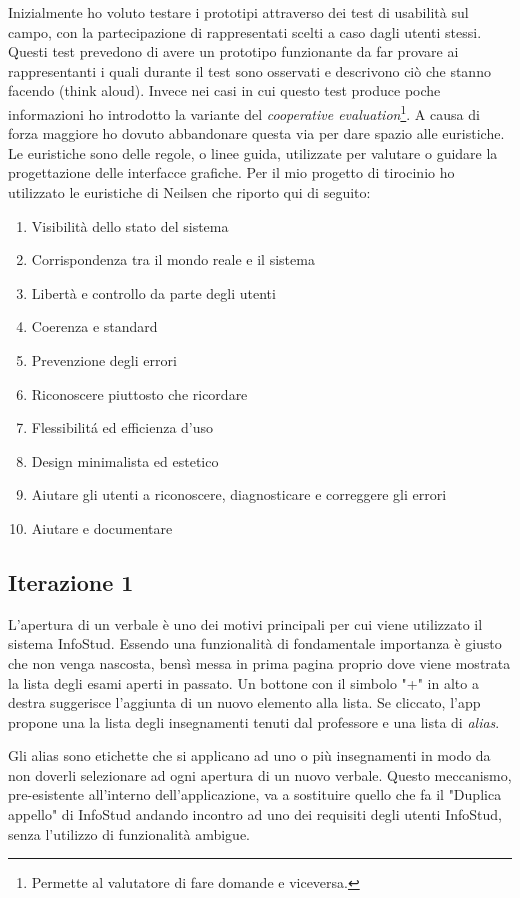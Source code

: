\documentclass[Lau, oneside]{sapthesis}%
\begin{document}
Inizialmente ho voluto testare i prototipi attraverso dei test di usabilità sul campo, con la partecipazione di rappresentati scelti a caso dagli utenti stessi. Questi test prevedono di avere un prototipo funzionante da far provare ai rappresentanti i quali durante il test sono osservati e descrivono ciò che stanno facendo (think aloud). Invece nei casi in cui questo test produce poche informazioni ho introdotto la variante del \textit{cooperative evaluation}\footnote{Permette al valutatore di fare domande e viceversa.}. A causa di forza maggiore ho dovuto abbandonare questa via per dare spazio alle euristiche. %
Le euristiche sono delle regole, o linee guida, utilizzate per valutare o guidare la progettazione delle interfacce grafiche. Per il mio progetto di tirocinio ho utilizzato le euristiche di Neilsen che riporto qui di seguito:
\begin{enumerate}
	\item Visibilità dello stato del sistema
	\item Corrispondenza tra il mondo reale e il sistema
	\item Libertà e controllo da parte degli utenti
	\item Coerenza e standard
	\item Prevenzione degli errori
	\item Riconoscere piuttosto che ricordare
	\item Flessibilit\'a ed efficienza d’uso 
	\item Design minimalista ed estetico
	\item Aiutare gli utenti a riconoscere, diagnosticare e correggere gli errori
	\item Aiutare e documentare
\end{enumerate}

\subsection{Iterazione 1}
L'apertura di un verbale è uno dei motivi principali per cui viene utilizzato il sistema InfoStud. Essendo una funzionalità di fondamentale importanza è giusto che non venga nascosta, bensì messa in prima pagina proprio dove viene mostrata la lista degli esami aperti in passato. Un bottone con il simbolo "+" in alto a destra suggerisce l'aggiunta di un nuovo elemento alla lista. Se cliccato, l'app propone una la lista degli insegnamenti tenuti dal professore e una lista di \textit{alias}. 

Gli alias sono etichette che si applicano ad uno o più insegnamenti in modo da non doverli selezionare ad ogni apertura di un nuovo verbale. Questo meccanismo, pre-esistente all'interno dell'applicazione, va a sostituire quello che fa il "Duplica appello" di InfoStud andando incontro ad uno dei requisiti degli utenti InfoStud, senza l'utilizzo di funzionalità ambigue.
\end{document}
